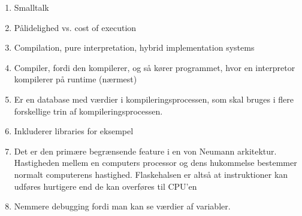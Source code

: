 \begin{enumerate}
	\item Smalltalk
	\item Pålidelighed vs. cost of execution
	\item Compilation, pure interpretation, hybrid implementation systems
	\item Compiler, fordi den kompilerer, og så kører programmet, hvor en interpretor kompilerer på runtime (nærmest)
	\item Er en database med værdier i kompileringsprocessen, som skal bruges i flere forskellige trin af kompileringsprocessen.
	\item Inkluderer libraries for eksempel
	\item Det er den primære begrænsende feature i en von Neumann arkitektur. Hastigheden mellem en computers processor og dens hukommelse bestemmer normalt computerens hastighed. Flaskehalsen er altså at instruktioner kan udføres hurtigere end de kan overføres til CPU'en
	\item Nemmere debugging fordi man kan se værdier af variabler. 
\end{enumerate}